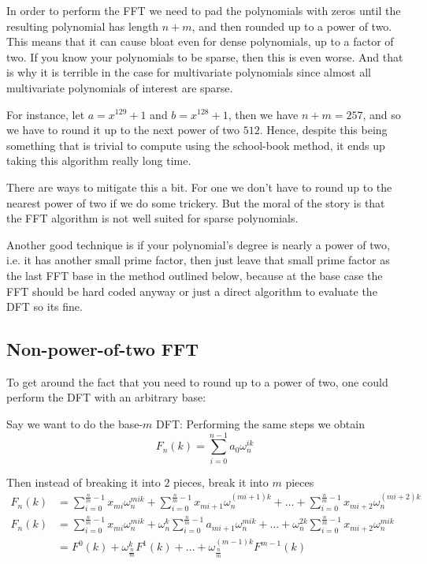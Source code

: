 \begin{remark}
    In order to perform the FFT we need to pad the polynomials with zeros until the resulting polynomial has length $n + m$, and then rounded up to a power of two. This means that it can cause bloat even for dense polynomials, up to a factor of two. If you know your polynomials to be sparse, then this is even worse. And that is why it is terrible in the case for multivariate polynomials since almost all multivariate polynomials of interest are sparse.

    For instance, let $a = x^{129} + 1$ and $b = x^{128} + 1$, then we have $n + m = 257$, and so we have to round it up to the next power of two $512$. Hence, despite this being something that is trivial to compute using the school-book method, it ends up taking this algorithm really long time.

    There are ways to mitigate this a bit. For one we don't have to round up to the nearest power of two if we do some trickery. But the moral of the story is that the FFT algorithm is not well suited for sparse polynomials.

    Another good technique is if your polynomial's degree is nearly a power of two, i.e. it has another small prime factor, then just leave that small prime factor as the last FFT base in the method outlined below, because at the base case the FFT should be hard coded anyway or just a direct algorithm to evaluate the DFT so its fine.
\end{remark}

\subsection{Non-power-of-two FFT}

To get around the fact that you need to round up to a power of two, one could perform the DFT with an arbitrary base:

Say we want to do the base-$m$ DFT:
Performing the same steps we obtain
\[
    F_n(k) = \sum^{n-1}_{i=0} a_0\omega_n^{ik} 
\]

Then instead of breaking it into $2$ pieces, break it into $m$ pieces
\begin{align*}
    F_n(k) &= \sum^{\frac{n}{m}-1}_{i=0} x_{mi}\omega_n^{mik} + \sum^{\frac{n}{m}-1}_{i=0} x_{mi+1}\omega_n^{(mi+1)k} + \ldots + \sum^{\frac{n}{m}-1}_{i=0} x_{mi+2}\omega_n^{(mi+2)k}\\
    F_n(k) &= \sum^{\frac{n}{m}-1}_{i=0} x_{mi}\omega_n^{mik} + \omega_n^k\sum^{\frac{n}{m}-1}_{i=0} a_{mi+1}\omega_n^{mik} + \ldots +  \omega_n^{2k}\sum^{\frac{n}{m}-1}_{i=0} x_{mi+2}\omega_n^{mik}\\
    &= F^0(k) + \omega_{\frac{n}{m}}^k F^1(k) + \ldots + \omega_{\frac{n}{m}}^{(m-1)k} F^{m-1}(k)
\end{align*}

